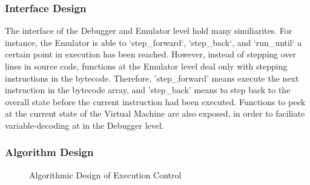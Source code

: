 \documentclass{report}
\begin{document}
    \subsubsection{Interface Design}
        The interface of the Debugger and Emulator level hold many similiarites. For instance, the Emulator is able to `step\_forward`, `step\_back`, and `run\_until` a certain point in execution has been reached. However, instead of stepping over lines in source code, functions at the Emulator level deal only with stepping instructions in the bytecode. Therefore, 'step\_forward' means execute the next instruction in the bytecode array, and 'step\_back' means to step back to the overall state before the current instruction had been executed. Functions to peek at the current state of the Virtual Machine are also exposed, in order to faciliate variable-decoding at in the Debugger level.

    \subsubsection{Algorithm Design}

\begin{figure}[h]
\centering
    \caption{Algorithmic Design of Execution Control}
\end{figure}
\end{document}
